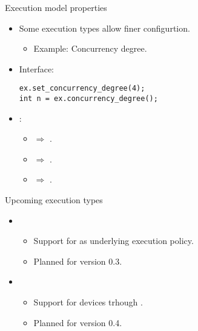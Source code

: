 \begin{frame}[t,fragile]{Execution model properties}
\begin{itemize}
  \item Some execution types allow finer configurtion.
    \begin{itemize}
      \item Example: Concurrency degree.
    \end{itemize}

  \vfill\pause
  \item Interface:
\begin{lstlisting}[basicstyle=\small]
ex.set_concurrency_degree(4);
int n = ex.concurrency_degree();
\end{lstlisting}

  \vfill\pause
  \item {}:
    \begin{itemize}
      \item {} $\Rightarrow$ .
      \item {} $\Rightarrow$ .
      \item {} $\Rightarrow$ .
    \end{itemize}

\end{itemize}
\end{frame}

\begin{frame}[t]{Upcoming execution types}
\begin{itemize}
  \item {}
    \begin{itemize}
      \item Support for  as underlying execution policy.
      \item Planned for version 0.3.
    \end{itemize}

  \vspace{2em}
  \item {}
    \begin{itemize}
      \item Support for  devices trhough .
      \item Planned for version 0.4.
    \end{itemize}
\end{itemize}
\end{frame}
